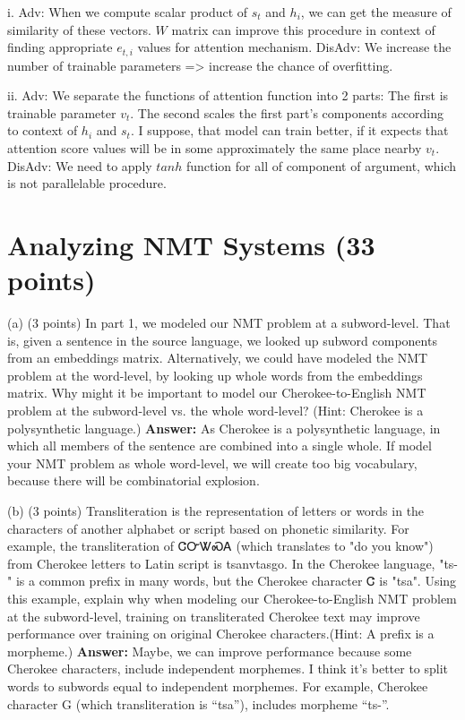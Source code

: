 \documentclass{article}
\begin{document}
	i. Adv:
	When we compute scalar product of $s_{t}$ and $h_{i}$, we can get the measure of similarity of these vectors.
	$W$ matrix can improve this procedure in context of finding appropriate $e_{t,i}$ values for attention mechanism.
	DisAdv:
	We increase the number of trainable parameters => increase the chance of overfitting.
	
	ii.
	Adv:
	We separate the functions of attention function into 2 parts:
	The first is trainable parameter $v_{t}$.
	The second scales the first part’s components according to context of $h_{i}$ and $s_{t}$.
	I suppose, that model can train better, if it expects that attention score values will be in some approximately the same place nearby $v_{t}$.
	DisAdv:
	We need to apply $tanh$ function for all of component of argument, which is not parallelable procedure.
	\bigbreak
	
	\section{Analyzing NMT Systems (33 points)}
	
	\bigbreak
	(a) (3 points)  In part 1, we modeled our NMT problem at a subword-level. That is, given a sentence in the source language, we looked up subword components from an embeddings matrix. Alternatively, we could have modeled the NMT problem at the word-level, by looking up whole words from the embeddings matrix. Why might it be important to model our Cherokee-to-English NMT problem at the subword-level vs. the whole word-level? (Hint: Cherokee is a polysynthetic language.)
	\smallbreak
	\textbf{Answer:} 
	As Cherokee is a polysynthetic language, in which all members of the sentence are combined into a single whole. If model your NMT problem as whole word-level, we will create too big vocabulary, because there will be combinatorial explosion.

	\bigbreak
	(b) (3 points)	Transliteration is the representation of letters or words in the characters of another alphabet or script based on phonetic similarity. For example, the transliteration of {\cherokeefam Ꮳ⁠Ꮕ⁠Ꮤ⁠Ꮝ⁠Ꭺ} (which translates to "do you know") from Cherokee letters to Latin script is tsanvtasgo. In the Cherokee language, "ts-" is a common prefix in many words, but the Cherokee character {\cherokeefam Ꮳ} is "tsa". Using this example, explain why when modeling our Cherokee-to-English NMT problem at the subword-level, training on transliterated Cherokee text may improve performance over training on original Cherokee characters.(Hint: A prefix is a morpheme.)
	\smallbreak
	\textbf{Answer:}
	Maybe, we can improve performance because some Cherokee characters, include independent morphemes. I think it’s better to split words to subwords equal to independent morphemes. For example, Cherokee character G (which transliteration is “tsa”), includes morpheme “ts-”. 
	
\end{document}
